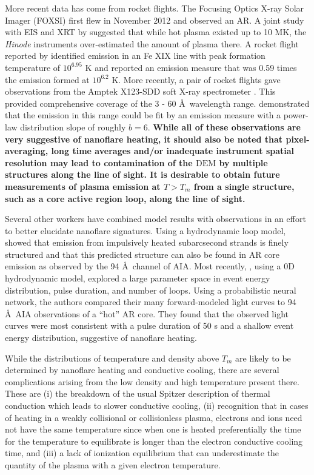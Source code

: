\documentclass[iop]{emulateapj}
\newcommand{\ang}{\AA~}
\begin{document}
	\par More recent data has come from rocket flights. The Focusing Optics X-ray Solar Imager (FOXSI) \citep{krucker_focusing_2013} first flew in November 2012 and observed an AR. A joint study with EIS and XRT by \citet{ishikawa_constraining_2014} suggested that while hot plasma existed up to 10 MK, the \textit{Hinode} instruments over-estimated the amount of plasma there. A rocket flight reported by \citet{brosius_pervasive_2014} identified emission in an Fe XIX line with peak formation temperature of $10^{6.95}$ K and reported an emission measure that was 0.59 times the emission formed at $10^{6.2}$ K. More recently, a pair of rocket flights gave observations from the Amptek X123-SDD soft X-ray spectrometer \citep{caspi_new_2015}. This provided comprehensive coverage of the 3 - 60 \ang wavelength range. \citeauthor{caspi_new_2015} demonstrated that the emission in this range could be fit by an emission measure with a power-law distribution slope of roughly $b = 6$. \textbf{While all of these observations are very suggestive of nanoflare heating, it should also be noted that pixel-averaging, long time averages and/or inadequate instrument spatial resolution may lead to contamination of the $\mathrm{DEM}$ by multiple structures along the line of sight. It is desirable to obtain future measurements of plasma emission at $T>T_m$ from a single structure, such as a core active region loop, along the line of sight.}
%
	\par Several other workers have combined model results with observations in an effort to better elucidate nanoflare signatures. Using a hydrodynamic loop model, \citet{reale_solar_2011} showed that emission from impulsively heated subarcsecond strands is finely structured and that this predicted structure can also be found in AR core emission as observed by the 94 \ang channel of AIA. Most recently, \citet{tajfirouze_time-resolved_2016}, using a 0D hydrodynamic model, explored a large parameter space in event energy distribution, pulse duration, and number of loops. Using a probabilistic neural network, the authors compared their many forward-modeled light curves to 94 \ang AIA observations of a ``hot'' AR core. They found that the observed light curves were most consistent with a pulse duration of 50 s and a shallow event energy distribution, suggestive of nanoflare heating.
%
	\par While the distributions of temperature and density above $T_m$ are likely to be determined by nanoflare heating and conductive cooling, there are several complications arising from the low density and high temperature present there. These are (i) the breakdown of the usual Spitzer description of thermal conduction which leads to slower conductive cooling, (ii) recognition that in cases of heating in a weakly collisional or collisionless plasma, electrons and ions need not have the same temperature since when one is heated preferentially the time for the temperature to equilibrate is longer than the electron conductive cooling time, and (iii) a lack of ionization equilibrium that can underestimate the quantity of the plasma with a given electron temperature.
\end{document}
